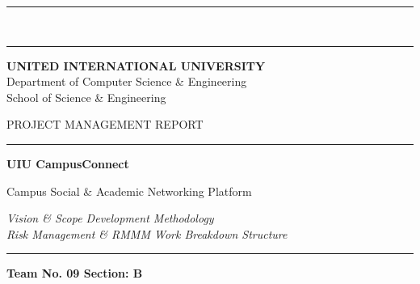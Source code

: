\documentclass[11pt,a4paper]{report}
\begin{document}
\begin{titlepage}
\thispagestyle{empty}
\centering
\vspace*{0.6cm}

{\color{uiuGold}\rule{\textwidth}{2.5pt}}\\[2pt]
{\color{uiuNavy}\rule{\textwidth}{0.8pt}}

\vspace{1.0cm}

{\sffamily\bfseries\Large\color{uiuNavy} UNITED INTERNATIONAL UNIVERSITY}\\[6pt]
{\sffamily\large\color{uiuBlue} Department of Computer Science \& Engineering}\\[4pt]
{\sffamily\normalsize\color{uiuTeal} School of Science \& Engineering}

\vspace{1.6cm}

{\sffamily\normalsize\color{uiuBlue}\MakeUppercase{Project Management Report}}

\vspace{0.7cm}

{\color{uiuGold}\rule{0.35\textwidth}{1.2pt}}

\vspace{0.9cm}

{\sffamily\bfseries\fontsize{34}{40}\selectfont\color{uiuNavy} UIU CampusConnect}

\vspace{0.5cm}

{\sffamily\Large\color{uiuBlue} Campus Social \& Academic Networking Platform}

\vspace{0.45cm}

{\itshape\normalsize\color{black!70} Vision \& Scope \quad\textbullet\quad Development Methodology \\[2pt]
Risk Management \& RMMM \quad\textbullet\quad Work Breakdown Structure}

\vspace{0.9cm}

{\color{uiuGold}\rule{0.35\textwidth}{1.2pt}}

\vspace{1.1cm}

{\sffamily\large\bfseries\color{uiuNavy} Team No. 09 \quad\textbar\quad Section: B}

\vspace{0.5cm}


\end{titlepage}
\end{document}
